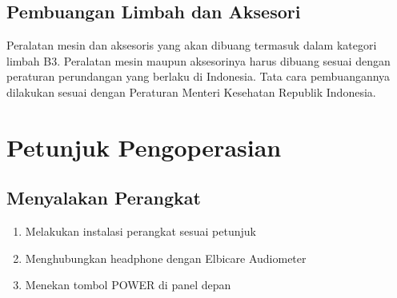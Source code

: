 \documentclass[11pt,a4paper,twoside,onecolumn]{book}
\begin{document}
		\section{Pembuangan Limbah dan Aksesori}
		Peralatan mesin dan aksesoris yang akan dibuang termasuk dalam kategori limbah B3. Peralatan mesin maupun aksesorinya harus dibuang sesuai dengan peraturan perundangan yang berlaku di Indonesia. Tata cara pembuangannya dilakukan sesuai dengan Peraturan Menteri Kesehatan Republik Indonesia.
		
	\newpage
	
	
%		
	
	\chapter{Petunjuk Pengoperasian}
		\section{Menyalakan Perangkat}
		\begin{enumerate}
			\item Melakukan instalasi perangkat sesuai petunjuk
			\item Menghubungkan headphone dengan Elbicare Audiometer
			\item Menekan tombol POWER di panel depan
		\end{enumerate}
	
\end{document}
